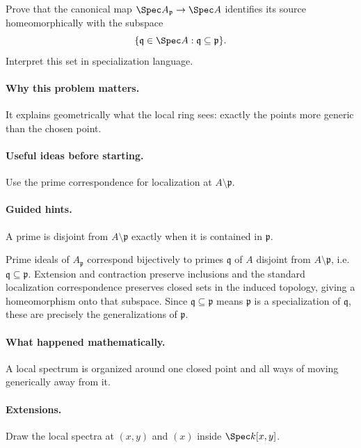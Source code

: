 \begin{problem}
Prove that the canonical map $\Spec A_{\mathfrak p}\to\Spec A$ identifies its source homeomorphically with the subspace
\[
\{\mathfrak q\in\Spec A:\mathfrak q\subseteq\mathfrak p\}.
\]
Interpret this set in specialization language.
\end{problem}

\paragraph{Why this problem matters.}
It explains geometrically what the local ring sees: exactly the points more generic than the chosen point.

\paragraph{Useful ideas before starting.}
Use the prime correspondence for localization at $A\setminus\mathfrak p$.

\paragraph{Guided hints.}
A prime is disjoint from $A\setminus\mathfrak p$ exactly when it is contained in $\mathfrak p$.

\begin{solution}
Prime ideals of $A_{\mathfrak p}$ correspond bijectively to primes $\mathfrak q$ of $A$ disjoint from $A\setminus\mathfrak p$, i.e. $\mathfrak q\subseteq\mathfrak p$.  Extension and contraction preserve inclusions and the standard localization correspondence preserves closed sets in the induced topology, giving a homeomorphism onto that subspace.  Since $\mathfrak q\subseteq\mathfrak p$ means $\mathfrak p$ is a specialization of $\mathfrak q$, these are precisely the generalizations of $\mathfrak p$.
\end{solution}

\paragraph{What happened mathematically.}
A local spectrum is organized around one closed point and all ways of moving generically away from it.

\paragraph{Extensions.}
Draw the local spectra at $(x,y)$ and $(x)$ inside $\Spec k[x,y]$.
